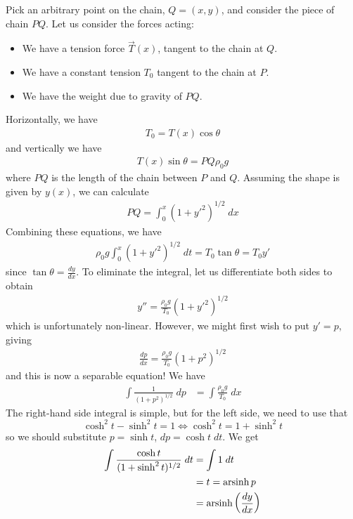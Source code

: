 \documentclass{../../template/note}
\begin{document}
    Pick an arbitrary point on the chain, $Q = (x, y)$, and consider the piece of chain $PQ$. Let us consider the forces acting:
    \begin{itemize}
        \item We have a tension force $\vec T(x)$, tangent to the chain at $Q$.
        \item We have a constant tension $T_0$ tangent to the chain at $P$.
        \item We have the weight due to gravity of $PQ$.
    \end{itemize}
    Horizontally, we have
    \begin{align}
        T_0 = T(x) \cos \theta
    \end{align}
    and vertically we have
    \begin{align}
        T(x) \sin \theta = PQ \rho_0 g
    \end{align}
    where $PQ$ is the length of the chain between $P$ and $Q$. Assuming the shape is given by $y(x)$, we can calculate
    \begin{align}
        PQ = \int_0^x \left(1 + y'^2\right)^{1/2} \; dx
    \end{align}
    Combining these equations, we have
    \begin{align}
        \rho_0 g \int_0^x \left(1 + y'^2\right)^{1/2} \; dt = T_0 \tan \theta = T_0 y'
    \end{align}
    since $\tan \theta = \frac{dy}{dx}$. To eliminate the integral, let us differentiate both sides to obtain
    \begin{align*}
        y'' = \frac{\rho_0g}{T_0}\left(1+y'^2\right)^{1/2}
    \end{align*}
    which is unfortunately non-linear. However, we might first wish to put $y' = p$, giving
    \begin{align*}
        \frac{dp}{dx} = \frac{\rho_0g}{T_0}\left(1+p^2\right)^{1/2}
    \end{align*}
    and this is now a separable equation! We have
    \begin{align*}
        \int \frac{1}{(1+p^2)^{1/2}} \; dp &= \int \frac{\rho_0g}{T_0} \; dx
    \end{align*}
    The right-hand side integral is simple, but for the left side, we need to use that
    \[
        \cosh^2 t - \sinh^2 t = 1 \iff \cosh^2 t = 1 + \sinh^2 t
    \]
    so we should substitute $p = \sinh t$, $dp = \cosh t \; dt$. We get
    \begin{align*}
        \int \frac{\cosh t}{(1+\sinh^2t)^{1/2}} \; dt &= \int 1 \; dt \\
        &= t = \operatorname{arsinh} p \\
        &= \operatorname{arsinh}\left(\frac{dy}{dx}\right)
    \end{align*}
\end{document}
